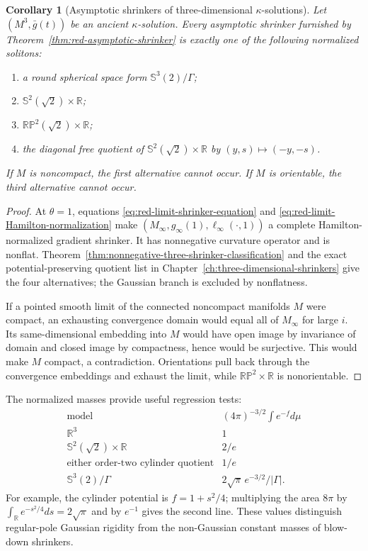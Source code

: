 \documentclass[10pt]{coll-l}
\newcommand{\Sph}{\mathbb{S}}
\newtheorem{corollary}[theorem]{Corollary}
\theoremstyle{definition}
\theoremstyle{remark}
\numberwithin{section}{chapter}
\numberwithin{equation}{chapter}
\begin{document}
\begin{corollary}[Asymptotic shrinkers of three-dimensional
$\kappa$-solutions]
\label{cor:red-three-asymptotic-shrinker}
Let $(M^3,\bar g(t))$ be an ancient $\kappa$-solution.  Every asymptotic
shrinker furnished by Theorem~\ref{thm:red-asymptotic-shrinker} is exactly
one of the following normalized solitons:
\begin{enumerate}
\item a round spherical space form $\Sph^3(2)/\Gamma$;
\item $\Sph^2(\sqrt2)\times\mathbb R$;
\item $\mathbb {RP}^2(\sqrt2)\times\mathbb R$;
\item the diagonal free quotient of $\Sph^2(\sqrt2)\times\mathbb R$ by
      $(y,s)\mapsto(-y,-s)$.
\end{enumerate}
If $M$ is noncompact, the first alternative cannot occur.  If $M$ is
orientable, the third alternative cannot occur.
\end{corollary}

\begin{proof}
At $\theta=1$, equations \eqref{eq:red-limit-shrinker-equation} and
\eqref{eq:red-limit-Hamilton-normalization} make
$(M_\infty,g_\infty(1),\ell_\infty(\cdot,1))$ a complete Hamilton-normalized
gradient shrinker.  It has nonnegative curvature operator and is nonflat.
Theorem~\ref{thm:nonnegative-three-shrinker-classification} and the exact
potential-preserving quotient list in
Chapter~\ref{ch:three-dimensional-shrinkers} give the four alternatives;
the Gaussian branch is excluded by nonflatness.

If a pointed smooth limit of the connected noncompact manifolds $M$ were
compact, an exhausting convergence domain would equal all of $M_\infty$ for
large $i$.  Its same-dimensional embedding into $M$ would have open image by
invariance of domain and closed image by compactness, hence would be
surjective.  This would make $M$ compact, a contradiction.  Orientations
pull back through the convergence embeddings and exhaust the limit, while
$\mathbb {RP}^2\times\mathbb R$ is nonorientable.
\end{proof}

The normalized masses provide useful regression tests:
\begin{equation}
 \begin{array}{c|c}
 \text{model}&(4\pi)^{-3/2}\int e^{-f}d\mu\\ \hline
 \mathbb R^3&1\\
 \Sph^2(\sqrt2)\times\mathbb R&2/e\\
 \text{either order-two cylinder quotient}&1/e\\
 \Sph^3(2)/\Gamma&2\sqrt\pi\,e^{-3/2}/|\Gamma|.
 \end{array}                                             \label{eq:red-three-density-regression}
\end{equation}
For example, the cylinder potential is $f=1+s^2/4$; multiplying the area
$8\pi$ by $\int_\mathbb R e^{-s^2/4}ds=2\sqrt\pi$ and by $e^{-1}$ gives the
second line.  These values distinguish regular-pole Gaussian rigidity from
the non-Gaussian constant masses of blow-down shrinkers.
\end{document}

